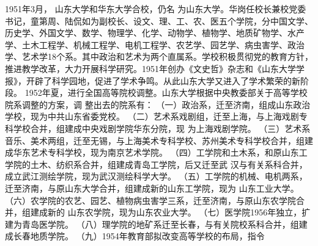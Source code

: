 \documentclass[openany]{sduthesis} %
\begin{document}
1951年3月， 山东大学和华东大学合校，仍名 为山东大学。华岗任校长兼校党委书记，童第周、陆侃如为副校长、设文、理、工、农、医五个学院，分中国文学、历史学、外国文学、数学、物理学、化学、动物学、植物学、地质矿物学、水产学、土木工程学、机械工程学、电机工程学、农艺学、园艺学、病虫害学、政治 学、艺术学18个系。其中政治和艺术为两个直属系。学校积极贯彻党的教育方针，推进教学改革，大力开展科学研究。1951年创办《文史哲》杂志和《山东大学学报》，开辟了科学园地，促进了学术争鸣。从此山东大学又进入了学术繁荣的新阶段。 1952年夏，进行全国高等院校调整。山东大学根据中央教委部关于高等学校院系调整的方案，调 整出去的院系有： （一）政治系，迁至济南，组成山东政治学校，现为中共山东省委党校。 （二）艺术系戏剧组，迁至上海，与上海戏剧专科学校合并，组建成中央戏剧学院华东分院，现 为上海戏剧学院。 （三）艺术系音乐、美术两组，迁至无锡，与上海美术专科学校、苏州美术专科学校合并，组建 成华东艺术专科学校，现为南京艺术学院。 （四）工学院和土木系，和原山东工学院的土木、纺织系合并，组建成青岛工学院，后又迁至武 汉与有关系科合并，成立武江测绘学院，现为武汉测绘科学大学。 （五）工学院的机械、电机两系，迁至济南，与原山东大学合并，组建成新的山东工学院，现为 山东工业大学。 （六）农学院的农艺、园艺、植物病虫害学三系，迁至济南，与原山东农学院合并，组建成新的 山东农学院，现为山东农业大学。 （七）医学院1956年独立，扩建为青岛医学院。 （八）理学院的地矿系迁至长春，与有关院校系科合并，组建成长春地质学院。 （九）1954年教育部拟改变高等学校的布局，指令
\end{document}
